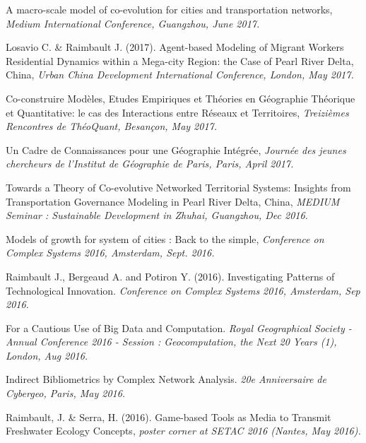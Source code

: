 \bigskip


\noindent A macro-scale model of co-evolution for cities and transportation networks, \textit{Medium International Conference, Guangzhou, June 2017.}


\bigskip

\noindent Losavio C. \& Raimbault J. (2017). Agent-based Modeling of Migrant Workers Residential Dynamics within a Mega-city Region: the Case of Pearl River Delta, China, \textit{Urban China Development International Conference, London, May 2017.}


\bigskip

\noindent Co-construire Modèles, Etudes Empiriques et Théories en Géographie Théorique et Quantitative: le cas des Interactions entre Réseaux et Territoires, \textit{Treizièmes Rencontres de ThéoQuant, Besançon, May 2017.}


\bigskip

\noindent Un Cadre de Connaissances pour une Géographie Intégrée,  \textit{Journée des jeunes chercheurs de l'Institut de Géographie de Paris, Paris, April 2017.}


\bigskip


\noindent Towards a Theory of Co-evolutive Networked Territorial Systems: Insights from Transportation Governance Modeling in Pearl River Delta, China, \textit{MEDIUM Seminar : Sustainable Development in Zhuhai, Guangzhou, Dec 2016.}


\bigskip


\noindent Models of growth for system of cities : Back to the simple, \textit{Conference on Complex Systems 2016, Amsterdam, Sept. 2016.}


\bigskip

\noindent Raimbault J., Bergeaud A. and Potiron Y. (2016). Investigating Patterns of Technological Innovation. \textit{Conference on Complex Systems 2016, Amsterdam, Sep 2016.}


\bigskip

\noindent For a Cautious Use of Big Data and Computation. \textit{Royal Geographical Society - Annual Conference 2016 - Session : Geocomputation, the Next 20 Years (1), London, Aug 2016.}


\bigskip

\noindent Indirect Bibliometrics by Complex Network Analysis. \textit{20e Anniversaire de Cybergeo, Paris, May 2016.}


\bigskip

\noindent Raimbault, J. \& Serra, H. (2016). Game-based Tools as Media to Transmit Freshwater Ecology Concepts, \textit{poster corner at SETAC 2016 (Nantes, May 2016).}


